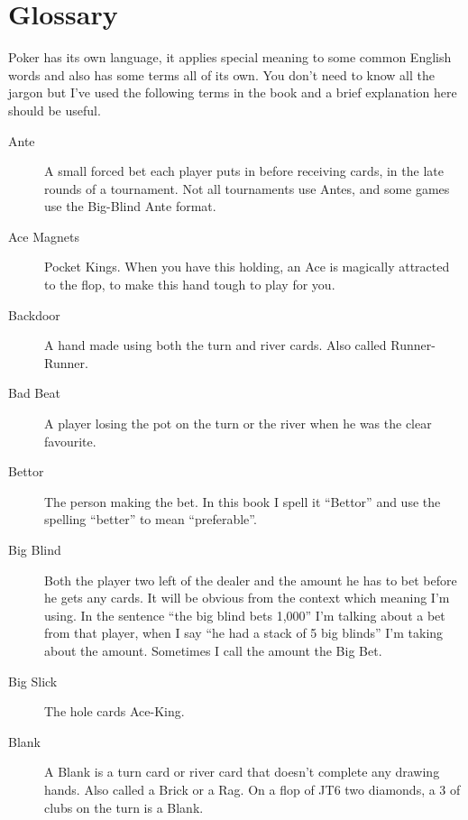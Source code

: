 \chapter{Glossary}



Poker has its own language, it applies special meaning to some
common English words and also has some terms all of its own. You
don't need to know all the jargon but I've used the following terms
in the book and a brief explanation here should be useful.

\begin{description}

\item[Ante] A small forced bet each player puts in before receiving
cards, in the late rounds of a tournament. Not all tournaments use
Antes, and some games use the Big-Blind Ante format.

\item[Ace Magnets] Pocket Kings. When you have this holding, an Ace is
magically attracted to the flop, to make this hand tough to play for
you.

\item[Backdoor] A hand made using both the turn and river cards. Also
called Runner-Runner.

\item[Bad Beat] A player losing the pot on the turn or the river when
he was the clear favourite.

\item[Bettor] The person making the bet. In this book I spell it ``Bettor''
and use the spelling ``better'' to mean ``preferable''.

\item[Big Blind] Both the player two left of the dealer and the amount
he has to bet before he gets any cards. It will be obvious from the
context which meaning I'm using. In the sentence ``the big blind bets
1,000'' I'm talking about a bet from that player, when I say ``he had
a stack of 5 big blinds'' I'm taking about the amount. Sometimes I
call the amount the Big Bet.

\item[Big Slick] The hole cards Ace-King.

\item[Blank] A Blank is a turn card or river card that doesn't
complete any drawing hands. Also called a Brick or a Rag. On a flop of
JT6 two diamonds, a 3 of clubs on the turn is a Blank.


\end{description}
